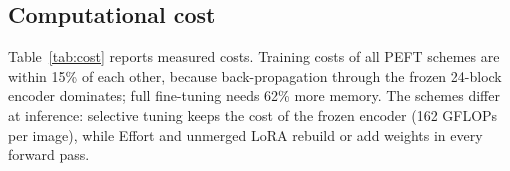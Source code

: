 \documentclass[fonts]{icst}
\begin{document}
\begin{table}[!t]
\centering
\caption{Training and post-hoc variants (video AUC). Seed 1024 unless $n$ is given. Soups average seeds 1024, 1 and 2.}
\label{tab:extra}
\footnotesize
{}
\end{table}

\subsection{Computational cost}
\label{sec:cost}
Table~\ref{tab:cost} reports measured costs. Training costs of all PEFT schemes are within 15\% of each other, because back-propagation through the frozen 24-block encoder dominates; full fine-tuning needs 62\% more memory. The schemes differ at inference: selective tuning keeps the cost of the frozen encoder (162 GFLOPs per image), while Effort and unmerged LoRA rebuild or add weights in every forward pass.
\end{document}

